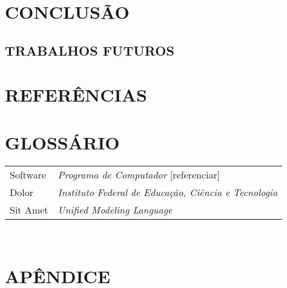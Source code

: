\documentclass[12pt,a4paper]{article}
\begin{document}
	\newpage


	\section{CONCLUSÃO}

	\lipsum[1]

		\subsection{TRABALHOS FUTUROS}

			\lipsum[1]

	\newpage


	\section*{REFERÊNCIAS}

	\printbibliography[heading=none]

	\newpage

	\section*{GLOSSÁRIO}

	\begin{tabular}{p{3cm} p{}}
	  Software & \textit{Programa de Computador} [referenciar] \\
	  Dolor & \textit{Instituto Federal de Educação, Ciência e Tecnologia} \\
	  Sit Amet & \textit{Unified Modeling Language} \\
	\end{tabular}\\


	\newpage

	\section*{APÊNDICE}

	\lipsum[1]

	\newpage
\end{document}
